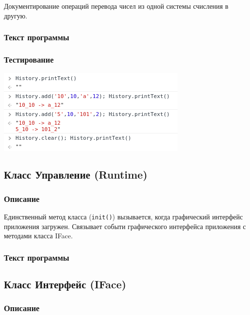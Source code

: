 \documentclass[oneside, final, 10pt]{extarticle}
\begin{document}
Документирование операций перевода чисел из одной системы счисления в другую.

\subsubsection{Текст программы}

\lstset{caption=history.js}


\subsubsection{Тестирование}
\includegraphics{./screen/test_history}

\subsection{Класс Управление (Runtime)}

\subsubsection{Описание}

Единственный метод класса (\verb`init()`) вызывается, когда графический интерфейс приложения загружен. Связывает событи графического интерфейса приложения с методами класса IFace.

\subsubsection{Текст программы}

\lstset{caption=runtime.js}


\subsection{Класс Интерфейс (IFace)}

\subsubsection{Описание}
\end{document}
